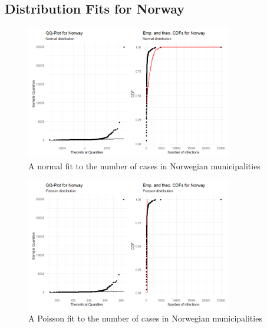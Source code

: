 \subsection{Distribution Fits for Norway}
%     
\begin{figure}[H]
    \centering
    \includegraphics[width = 0.8\textwidth]{fit_normal_norway.png}
    \caption{A normal fit to the number of cases in Norwegian municipalities}
    \label{fitNormalNorway}
\end{figure}
%     
\begin{figure}[H]
    \centering
    \includegraphics[width = 0.8\textwidth]{fit_poisson_norway.png}
    \caption{A Poisson fit to the number of cases in Norwegian municipalities}
    \label{fitPoissonNorway}
\end{figure}


